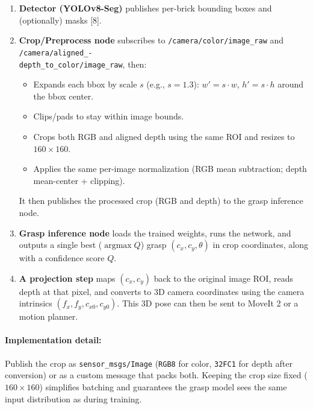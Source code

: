 \begin{enumerate}
    \item \textbf{Detector (YOLOv8-Seg)} publishes per-brick bounding boxes and (optionally) masks [8].

    \item \textbf{Crop/Preprocess node} subscribes to \texttt{/camera/color/image\_raw} and \texttt{/camera/aligned\_-\\depth\_to\_color/image\_raw}, then:
    \begin{itemize}
        \item Expands each bbox by scale $s$ (e.g., $s=1.3$): $w' = s \cdot w$, $h' = s \cdot h$ around the bbox center.
        \item Clips/pads to stay within image bounds.
        \item Crops both RGB and aligned depth using the same ROI and resizes to $160 \times 160$.
        \item Applies the same per-image normalization (RGB mean subtraction; depth mean-center + clipping).
    \end{itemize}
    It then publishes the processed crop (RGB and depth) to the grasp inference node.

    \item \textbf{Grasp inference node} loads the trained weights, runs the network, and outputs a single best ($\operatorname{argmax} Q$) grasp $(c_x, c_y, \theta)$ in crop coordinates, along with a confidence score $Q$.

    \item \textbf{A projection step} maps $(c_x, c_y)$ back to the original image ROI, reads depth at that pixel, and converts to 3D camera coordinates using the camera intrinsics $(f_x, f_y, c_{x0}, c_{y0})$. This 3D pose can then be sent to MoveIt 2 or a motion planner.
\end{enumerate}

\paragraph{Implementation detail:} Publish the crop as \texttt{sensor\_msgs/Image} (\texttt{RGB8} for color, \texttt{32FC1} for depth after conversion) or as a custom message that packs both. Keeping the crop size fixed ($160 \times 160$) simplifies batching and guarantees the grasp model sees the same input distribution as during training.